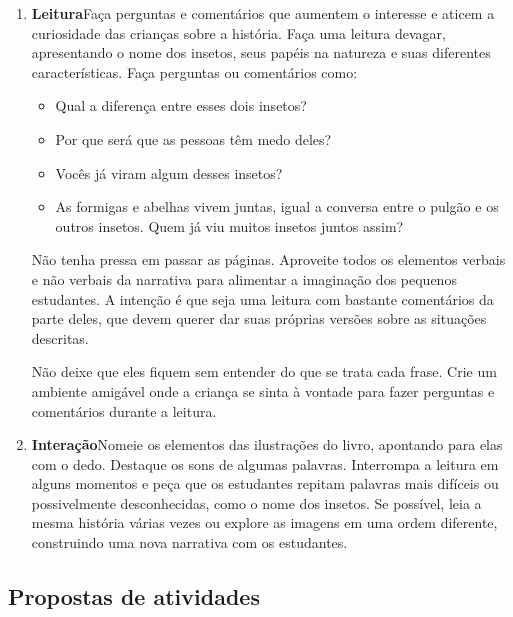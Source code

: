\documentclass[11pt]{extarticle}
\begin{document}
\begin{enumerate}
\item \textbf{Leitura}\quad Faça perguntas e comentários que aumentem o 
interesse e aticem a curiosidade das crianças sobre a história.
Faça uma leitura devagar, apresentando o nome dos insetos, seus papéis na natureza e suas diferentes características.
Faça  perguntas ou comentários como: 

\begin{itemize}
\item Qual a diferença entre esses dois insetos?
\item Por que será que as pessoas têm medo deles?
\item Vocês já viram algum desses insetos?
\item As formigas e abelhas vivem juntas, igual a conversa entre o pulgão e os outros insetos. Quem já viu muitos insetos juntos assim?
\end{itemize}

Não tenha pressa em passar as páginas. Aproveite todos
os elementos verbais e não verbais da narrativa
para alimentar a imaginação dos pequenos estudantes. 
A intenção é que seja uma leitura com bastante comentários
da parte deles, que devem querer dar suas próprias versões
sobre as situações descritas.

Não deixe que eles fiquem sem entender do que se trata cada frase. Crie 
um ambiente amigável onde a criança se sinta à vontade para fazer 
perguntas e comentários durante a leitura.




\item \textbf{Interação}\quad Nomeie os elementos das ilustrações 
do livro, apontando para elas com o dedo. Destaque os sons de algumas 
palavras. Interrompa a leitura em alguns momentos e peça que 
os estudantes repitam palavras mais difíceis ou possivelmente desconhecidas, como o nome dos insetos. Se possível, 
leia a mesma história várias vezes ou explore as imagens em uma ordem 
diferente, construindo uma nova narrativa com os estudantes. 
\end{enumerate}


\subsection{Propostas de atividades}
\end{document}
